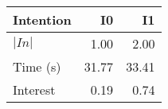 \begin{tabular}{lrr}
\toprule
Intention & I0 & I1 \\
\midrule
$|In|$ & 1.00 & 2.00 \\
Time (s) & 31.77 & 33.41 \\
Interest & 0.19 & 0.74 \\
\bottomrule
\end{tabular}
